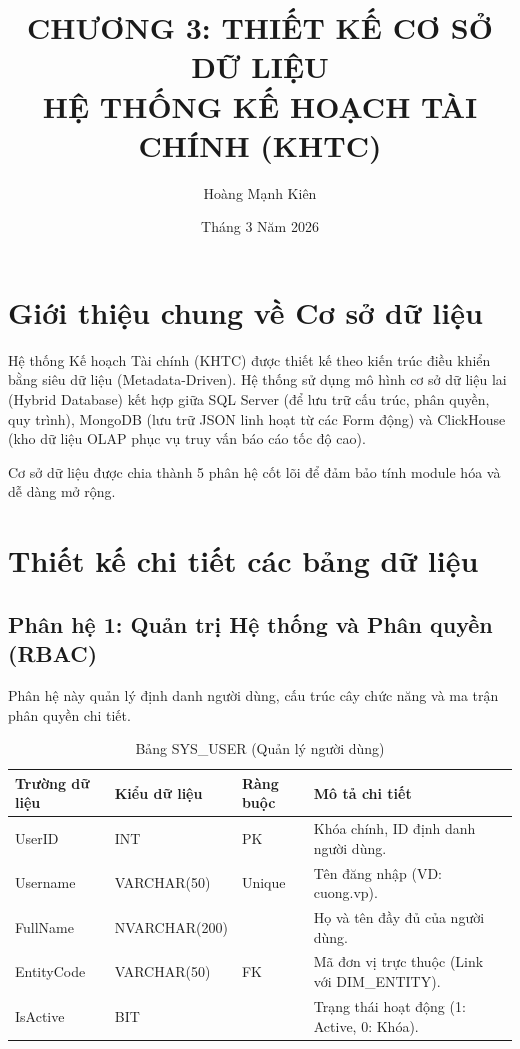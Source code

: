 \documentclass[12pt,a4paper]{article}
\title{\textbf{CHƯƠNG 3: THIẾT KẾ CƠ SỞ DỮ LIỆU} \\ \large{HỆ THỐNG KẾ HOẠCH TÀI CHÍNH (KHTC)}}
\author{Hoàng Mạnh Kiên}
\date{Tháng 3 Năm 2026}
\begin{document}
\maketitle

\section{Giới thiệu chung về Cơ sở dữ liệu}
Hệ thống Kế hoạch Tài chính (KHTC) được thiết kế theo kiến trúc điều khiển bằng siêu dữ liệu (Metadata-Driven). Hệ thống sử dụng mô hình cơ sở dữ liệu lai (Hybrid Database) kết hợp giữa SQL Server (để lưu trữ cấu trúc, phân quyền, quy trình), MongoDB (lưu trữ JSON linh hoạt từ các Form động) và ClickHouse (kho dữ liệu OLAP phục vụ truy vấn báo cáo tốc độ cao).

Cơ sở dữ liệu được chia thành 5 phân hệ cốt lõi để đảm bảo tính module hóa và dễ dàng mở rộng.

\section{Thiết kế chi tiết các bảng dữ liệu}

\subsection{Phân hệ 1: Quản trị Hệ thống và Phân quyền (RBAC)}
Phân hệ này quản lý định danh người dùng, cấu trúc cây chức năng và ma trận phân quyền chi tiết.

\begin{table}[h!]
    \centering
    \caption{Bảng SYS\_USER (Quản lý người dùng)}
    \begin{tabularx}{\textwidth}{|l|l|l|X|}
        \hline
        \textbf{Trường dữ liệu} & \textbf{Kiểu dữ liệu} & \textbf{Ràng buộc} & \textbf{Mô tả chi tiết} \\ \hline
        UserID & INT & PK & Khóa chính, ID định danh người dùng. \\ \hline
        Username & VARCHAR(50) & Unique & Tên đăng nhập (VD: cuong.vp). \\ \hline
        FullName & NVARCHAR(200) & & Họ và tên đầy đủ của người dùng. \\ \hline
        EntityCode & VARCHAR(50) & FK & Mã đơn vị trực thuộc (Link với DIM\_ENTITY). \\ \hline
        IsActive & BIT & & Trạng thái hoạt động (1: Active, 0: Khóa). \\ \hline
    \end{tabularx}
\end{table}
\end{document}
